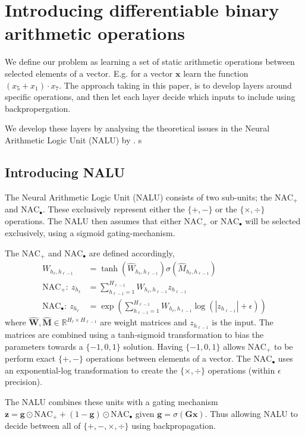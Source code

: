 \section{Introducing differentiable binary arithmetic operations}
\label{sec:Nalu}
We define our problem as learning a set of static arithmetic operations between selected elements of a vector. E.g. for a vector $\mathbf{x}$ learn the function ${(x_5 + x_1) \cdot x_7}$. The approach taking in this paper, is to develop layers around specific operations, and then let each layer decide which inputs to include using backpropergation.

We develop these layers by analysing the theoretical issues in the Neural Arithmetic Logic Unit (NALU) by \citet{trask-nalu}.
s
\subsection{Introducing NALU}
The Neural Arithmetic Logic Unit (NALU) consists of two sub-units; the $\text{NAC}_{+}$ and $\text{NAC}_{\bullet}$. These exclusively represent either the $\{+, -\}$ or the $\{\times, \div \}$ operations. The NALU then assumes that either $\text{NAC}_{+}$ or $\text{NAC}_{\bullet}$ will be selected exclusively, using a sigmoid gating-mechanism.

The $\text{NAC}_{+}$ and $\text{NAC}_{\bullet}$ are defined accordingly,
\begin{align}
W_{h_\ell, h_{\ell-1}} &= \tanh(\hat{W}_{h_\ell, h_{\ell-1}}) \sigma(\hat{M}_{h_\ell, h_{\ell-1}}) \label{eq:weight}\\
\textrm{NAC}_+:\ z_{h_\ell} &= \sum_{h_{\ell-1}=1}^{H_{\ell-1}} W_{h_{\ell}, h_{\ell-1}} z_{h_{\ell-1}} \label{eq:naca}\\
\textrm{NAC}_\bullet:\ z_{h_\ell} &= \exp\left(\sum_{h_{\ell-1}=1}^{H_{\ell-1}} W_{h_{\ell}, h_{\ell-1}} \label{eq:nacm}\log(|z_{h_{\ell-1}}| + \epsilon) \right)
\end{align}
where $\hat{\mathbf{W}}, \hat{\mathbf{M}} \in \mathbb{R}^{H_{\ell} \times H_{\ell-1}}$ are weight matrices and $z_{h_{\ell-1}}$ is the input. The matrices are combined using a tanh-sigmoid transformation to bias the parameters towards a $\{-1,0,1\}$ solution. Having $\{-1,0,1\}$ allows $\text{NAC}_{+}$ to be perform exact $\{+, -\}$ operations between elements of a vector.
The $\text{NAC}_{\bullet}$ uses an exponential-log transformation to create the $\{\times, \div \}$ operations (within $\epsilon$ precision).

The NALU combines these units with a gating mechanism $\mathbf{z} = \mathbf{g} \odot \text{NAC}_{+} + (1 - \mathbf{g}) \odot \text{NAC}_{\bullet}$ given $\mathbf{g} = \sigma(\mathbf{G} \mathbf{x})$. Thus allowing NALU to decide between all of $\{+, -, \times, \div\}$ using backpropagation.

